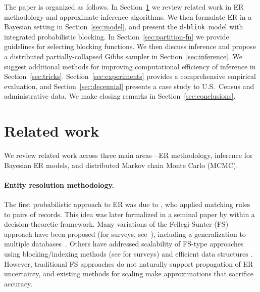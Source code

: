 \documentclass[12pt,letterpaper]{article}
\newcommand{\1}[1]{\mathbb{I}\!\left[#1\right]} %
\newcommand{\dblink}{\texttt{\upshape \lowercase{d-blink}}} %
\begin{document}
The paper is organized as follows. 
In Section~\ref{sec:related} we review related work in ER methodology 
and approximate inference algorithms. 
We then formulate ER in a Bayesian setting in Section~\ref{sec:model}, and 
present the \dblink\ model with integrated probabilistic blocking.
In Section~\ref{sec:partition-fn} we provide guidelines for selecting 
blocking functions. 
We then discuss inference and propose a distributed partially-collapsed 
Gibbs sampler in Section~\ref{sec:inference}. 
We suggest additional methods for improving computational efficiency of 
inference in Section~\ref{sec:tricks}.
Section~\ref{sec:experiments} provides a comprehensive empirical evaluation, 
and Section~\ref{sec:decennial} presents a case study to U.S.\ Census 
and administrative data. 
We make closing remarks in Section~\ref{sec:conclusions}.


\section{Related work}
\label{sec:related}
We review related work across three main areas---ER methodology, inference 
for Bayesian ER models, and distributed Markov chain Monte Carlo (MCMC).

\paragraph{Entity resolution methodology.}
The first probabilistic approach to ER was due to 
\citet{newcombe_automatic_1959}, who applied matching rules to 
pairs of records. 
This idea was later formalized in a seminal paper by 
\citet{fellegi_theory_1969} within a decision-theoretic framework.
Many variations of the Fellegi-Sunter (FS) approach have been proposed 
(for surveys, see~\citealp{winkler_overview_2006, winkler2014matching}), 
including a generalization to multiple 
databases~\citep{sadinle_generalized_2013}.
Others have addressed scalability of FS-type approaches using 
blocking\slash indexing methods (see 
\citealp{christen_data_2012,steorts_comparison_2014} for surveys) and 
efficient data structures \citep{enamorado_using_2019}.
However, traditional FS approaches do not naturally support propagation of 
ER uncertainty, and existing methods for scaling make approximations that 
sacrifice accuracy.
\end{document}
